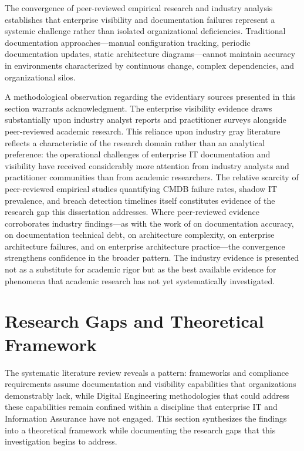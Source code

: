 The convergence of peer-reviewed empirical research and industry analysis establishes that enterprise visibility and documentation failures represent a systemic challenge rather than isolated organizational deficiencies. Traditional documentation approaches---manual configuration tracking, periodic documentation updates, static architecture diagrams---cannot maintain accuracy in environments characterized by continuous change, complex dependencies, and organizational silos.

A methodological observation regarding the evidentiary sources presented in this section warrants acknowledgment. The enterprise visibility evidence draws substantially upon industry analyst reports and practitioner surveys alongside peer-reviewed academic research. This reliance upon industry gray literature reflects a characteristic of the research domain rather than an analytical preference: the operational challenges of enterprise IT documentation and visibility have received considerably more attention from industry analysts and practitioner communities than from academic researchers. The relative scarcity of peer-reviewed empirical studies quantifying CMDB failure rates, shadow IT prevalence, and breach detection timelines itself constitutes evidence of the research gap this dissertation addresses. Where peer-reviewed evidence corroborates industry findings---as with the work of \citeauthor{Hauder_Matthes_Roth_2012} on documentation accuracy, \citeauthor{Santos_2019} on documentation technical debt, \citeauthor{Beese_2023} on architecture complexity, \citeauthor{Tamm_2022} on enterprise architecture failures, and \citeauthor{Kotusev_2019} on enterprise architecture practice---the convergence strengthens confidence in the broader pattern. The industry evidence is presented not as a substitute for academic rigor but as the best available evidence for phenomena that academic research has not yet systematically investigated.

\section{Research Gaps and Theoretical Framework}

The systematic literature review reveals a pattern: frameworks and compliance requirements assume documentation and visibility capabilities that organizations demonstrably lack, while Digital Engineering methodologies that could address these capabilities remain confined within a discipline that enterprise IT and Information Assurance have not engaged. This section synthesizes the findings into a theoretical framework while documenting the research gaps that this investigation begins to address.

